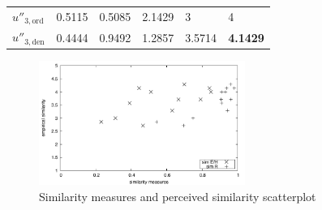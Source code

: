 \begin{longtable}[]{@{}llllll@{}}
\begin{minipage}[t]{0.15\columnwidth}
\(u''_{3,\text{ord}}\)\strut
\end{minipage} & \begin{minipage}[t]{0.08\columnwidth}\raggedright
0.5115\strut
\end{minipage} & \begin{minipage}[t]{0.07\columnwidth}\raggedright
0.5085\strut
\end{minipage} & \begin{minipage}[t]{0.20\columnwidth}\raggedright
2.1429\strut
\end{minipage} & \begin{minipage}[t]{0.17\columnwidth}\raggedright
3\strut
\end{minipage} & \begin{minipage}[t]{0.17\columnwidth}\raggedright
4\strut
\end{minipage}\tabularnewline
\begin{minipage}[t]{0.15\columnwidth}\raggedright
\(u''_{3,\text{den}}\)\strut
\end{minipage} & \begin{minipage}[t]{0.08\columnwidth}\raggedright
0.4444\strut
\end{minipage} & \begin{minipage}[t]{0.07\columnwidth}\raggedright
0.9492\strut
\end{minipage} & \begin{minipage}[t]{0.20\columnwidth}\raggedright
1.2857\strut
\end{minipage} & \begin{minipage}[t]{0.17\columnwidth}\raggedright
3.5714\strut
\end{minipage} & \begin{minipage}[t]{0.17\columnwidth}\raggedright
\textbf{4.1429}\strut
\end{minipage}\tabularnewline
\bottomrule
\end{longtable}

\begin{figure}[h!]
\hypertarget{fig:ci.scatter}{%
\centering
\includegraphics[width=0.6\textwidth]{../figures/visual-scatter.pdf}
\caption{Similarity measures and perceived similarity scatterplot}\label{fig:ci.scatter}
}
\end{figure}

